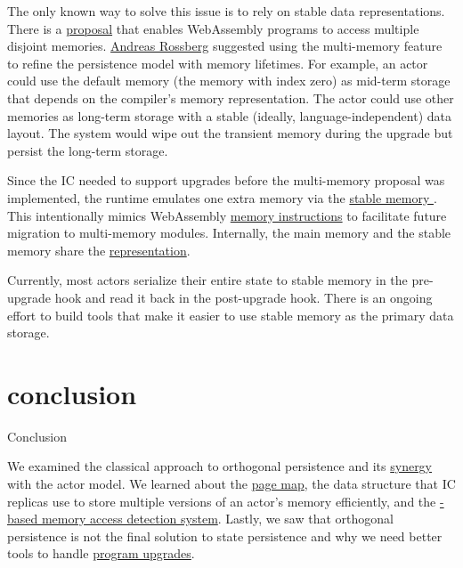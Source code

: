 \documentclass{article}
\begin{document}
The only known way to solve this issue is to rely on stable data representations.
There is a \href{https://github.com/WebAssembly/multi-memory}{proposal} that enables WebAssembly programs to access multiple disjoint memories.
\href{https://people.mpi-sws.org/~rossberg/}{Andreas Rossberg} suggested using the multi-memory feature to refine the persistence model with memory lifetimes.
For example, an actor could use the default memory (the memory with index zero) as mid-term storage that depends on the compiler's memory representation.
The actor could use other memories as long-term storage with a stable (ideally, language-independent) data layout.
The system would wipe out the transient memory during the upgrade but persist the long-term storage. 

Since the IC needed to support upgrades before the multi-memory proposal was implemented, the runtime emulates one extra memory via the \href{https://smartcontracts.org/docs/interface-spec/index.html#system-api-stable-memory}{stable memory }.
This  intentionally mimics WebAssembly \href{https://webassembly.github.io/bulk-memory-operations/core/exec/instructions.html#memory-instructions}{memory instructions} to facilitate future migration to multi-memory modules.
Internally, the main memory and the stable memory share the \href{#snapshots-deltas}{representation}.

Currently, most actors serialize their entire state to stable memory in the pre-upgrade hook and read it back in the post-upgrade hook.
There is an ongoing effort to build tools that make it easier to use stable memory as the primary data storage.

\section{conclusion}{Conclusion}

We examined the classical approach to orthogonal persistence and its \href{#actors}{synergy} with the actor model.
We learned about the \href{#snapshots-deltas}{page map}, the data structure that IC replicas use to store multiple versions of an actor's memory efficiently, and the \href{#signal-handler}{-based memory access detection system}.
Lastly, we saw that orthogonal persistence is not the final solution to state persistence and why we need better tools to handle \href{#upgrades}{program upgrades}.
\end{document}
